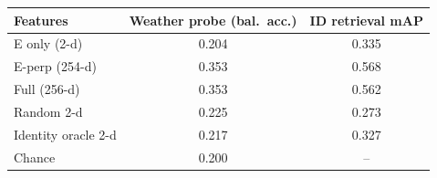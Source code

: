 \begin{tabular}{lcc}
\toprule
Features & Weather probe (bal.\ acc.) & ID retrieval mAP \\
\midrule
E only (2-d) & 0.204 & 0.335 \\
E-perp (254-d) & 0.353 & 0.568 \\
Full (256-d) & 0.353 & 0.562 \\
Random 2-d & 0.225 & 0.273 \\
Identity oracle 2-d & 0.217 & 0.327 \\
\midrule
Chance & 0.200 & -- \\
\bottomrule
\end{tabular}
